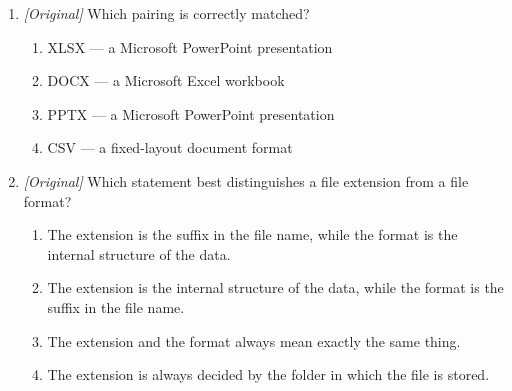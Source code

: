 \begin{enumerate}[label=\textbf{Q\arabic*.}, leftmargin=*]
\begin{enumerate}[label=\Alph*.]
    \item BMP
    \item TXT
  \end{enumerate}
\item \textit{[Original]} Which pairing is correctly matched?
  \begin{enumerate}[label=\Alph*.]
    \item XLSX --- a Microsoft PowerPoint presentation
    \item DOCX --- a Microsoft Excel workbook
    \item PPTX --- a Microsoft PowerPoint presentation
    \item CSV --- a fixed-layout document format
  \end{enumerate}
\item \textit{[Original]} Which statement best distinguishes a file extension
  from a file format?
  \begin{enumerate}[label=\Alph*.]
    \item The extension is the suffix in the file name, while the format is
      the internal structure of the data.
    \item The extension is the internal structure of the data, while the
      format is the suffix in the file name.
    \item The extension and the format always mean exactly the same thing.
    \item The extension is always decided by the folder in which the file is
      stored.
  \end{enumerate}


\end{enumerate}
